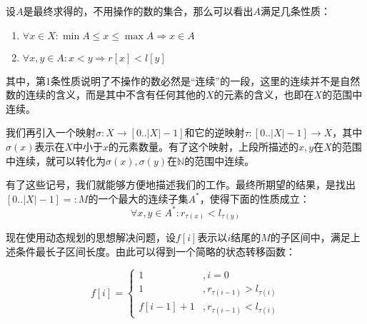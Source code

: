 \documentclass[UTF8]{ctexart}
\begin{document}
        设$A$是最终求得的，不用操作的数的集合，那么可以看出$A$满足几条性质：

        \begin{enumerate}
            \item $\forall x\in X: \min{A} \leq x \leq \max{A} \Rightarrow x\in A$
            \item $\forall x, y \in A: x < y \Rightarrow r[x] < l[y]$
        \end{enumerate}

        其中，第1条性质说明了不操作的数必然是``连续''的一段，这里的连续并不是自然数的连续的含义，而是其中不含有任何其他的$X$的元素的含义，也即在$X$的范围中连续。

        我们再引入一个映射$\sigma: X \to [0..|X|-1]$和它的逆映射$\tau: [0..|X|-1] \to X$，其中$\sigma(x)$表示在$X$中小于$x$的元素数量。有了这个映射，上段所描述的$x, y$在$X$的范围中连续，就可以转化为$\sigma(x), \sigma(y)$在$\mathbb{N}$的范围中连续。

        有了这些记号，我们就能够方便地描述我们的工作。最终所期望的结果，是找出$[0..|X|-1]=:M$的一个最大的连续子集$A^*$，使得下面的性质成立：
        $$\forall x, y \in A^*: r_{\tau(x)} < l_{\tau(y)}$$

        现在使用动态规划的思想解决问题，设$f[i]$表示以$i$结尾的$M$的子区间中，满足上述条件最长子区间长度。由此可以得到一个简略的状态转移函数：

        \begin{equation*}
            f[i] = 
            \begin{cases}
                1 &, i=0 \\
                1 &, r_{\tau({i-1})} > l_{\tau({i})} \\
                f[i-1] + 1 &, r_{\tau({i-1})} < l_{\tau({i})}
            \end{cases}
        \end{equation*}
\end{document}
